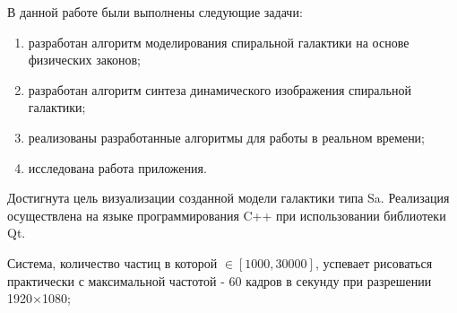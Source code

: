 \Conclusion

В данной работе были выполнены следующие задачи:
\begin{enumerate}
    \item разработан алгоритм моделирования спиральной галактики на основе физических законов;
    \item разработан алгоритм синтеза динамического изображения спиральной галактики;
    \item реализованы разработанные алгоритмы для работы в реальном времени;
    \item исследована работа приложения.
\end{enumerate}

Достигнута цель визуализации созданной модели галактики типа Sa. Реализация осуществлена на языке программирования C++ при использовании библиотеки Qt.

Система, количество частиц в которой $\in [1000, 30000]$, успевает рисоваться практически с максимальной частотой - 60 кадров в секунду при разрешении 1920$\times{}$1080;
